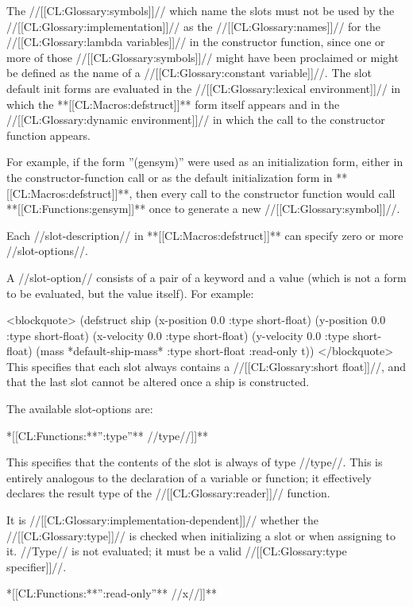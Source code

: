 The //[[CL:Glossary:symbols]]// which name the slots must not be used by the //[[CL:Glossary:implementation]]// as the //[[CL:Glossary:names]]// for the //[[CL:Glossary:lambda variables]]// in the constructor function, since one or more of those //[[CL:Glossary:symbols]]// might have been proclaimed  or might be defined as the name of a //[[CL:Glossary:constant variable]]//. The slot default init forms are evaluated in the //[[CL:Glossary:lexical environment]]// in which the **[[CL:Macros:defstruct]]** form itself appears and in the //[[CL:Glossary:dynamic environment]]// in which the call to the constructor function appears.

For example, if the form ''(gensym)'' were used as an initialization form, either in the constructor-function call or as the default initialization form in **[[CL:Macros:defstruct]]**, then every call to the constructor function would call **[[CL:Functions:gensym]]** once to generate a new //[[CL:Glossary:symbol]]//.

Each //slot-description// in **[[CL:Macros:defstruct]]** can specify zero or more //slot-options//.

A //slot-option// consists of a pair of a keyword and a value (which is not a form to be evaluated, but the value itself). For example:

<blockquote> (defstruct ship (x-position 0.0 :type short-float) (y-position 0.0 :type short-float) (x-velocity 0.0 :type short-float) (y-velocity 0.0 :type short-float) (mass *default-ship-mass* :type short-float :read-only t)) </blockquote> This specifies that each slot always contains a //[[CL:Glossary:short float]]//, and that the last slot cannot be altered once a ship is constructed.



The available slot-options are: \beginlist

\itemitem**[[CL:Functions:**'':type''** //type//]]**

This specifies that the contents of the slot is always of type //type//. This is entirely analogous to the declaration of a variable or function; it effectively declares the result type of the //[[CL:Glossary:reader]]// function.

It is //[[CL:Glossary:implementation-dependent]]// whether the //[[CL:Glossary:type]]// is checked when initializing a slot or when assigning to it. //Type// is not evaluated; it must be a valid //[[CL:Glossary:type specifier]]//.

\itemitem**[[CL:Functions:**'':read-only''** //x//]]**

